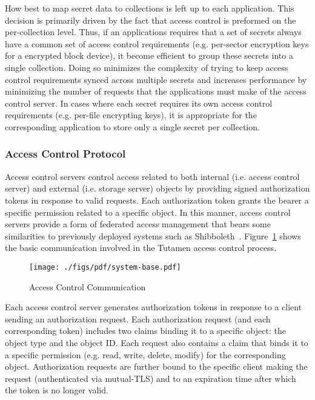 How best to map secret data to collections is left up to each
application. This decision is primarily driven by the fact that access
control is preformed on the per-collection level. Thus, if an
applications requires that a set of secrets always have a common set
of access control requirements (e.g. per-sector encryption keys for a
encrypted block device), it become efficient to group these secrets
into a single collection. Doing so minimizes the complexity of trying
to keep access control requirements synced across multiple secrets and
increases performance by minimizing the number of requests that the
applications must make of the access control server. In cases where
each secret requires its own access control requirements
(e.g. per-file encrypting keys), it is appropriate for the
corresponding application to store only a single secret per
collection.

\subsubsection{Access Control Protocol}
\label{sec:tutamen:arch:acp}

Access control servers control access related to both internal
(i.e. access control server) and external (i.e. storage server)
objects by providing signed authorization tokens in response to valid
requests. Each authorization token grants the bearer a specific
permission related to a specific object. In this manner, access
control servers provide a form of federated access management that
bears some similarities to previously deployed systems such as
Shibboleth~\cite{leandro2012}. Figure~\ref{fig:tutamen:systembase}
shows the basic communication involved in the Tutamen access control
process.

\begin{figure}[th]
  \centering
  \texttt{[image: ./figs/pdf/system-base.pdf]}
  \caption{Access Control Communication}
  \label{fig:tutamen:systembase}
\end{figure}

Each access control server generates authorization tokens in response
to a client sending an authorization request. Each authorization
request (and each corresponding token) includes two claims binding it
to a specific object: the object type and the object ID. Each request
also contains a claim that binds it to a specific permission
(e.g. read, write, delete, modify) for the corresponding
object. Authorization requests are further bound to the specific
client making the request (authenticated via mutual-TLS) and to an
expiration time after which the token is no longer valid.

